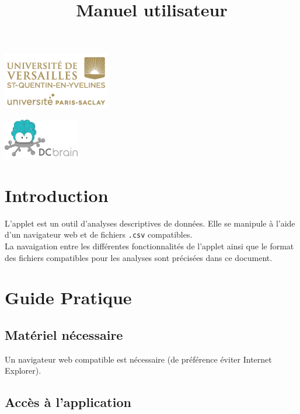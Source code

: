 

\title{\vspace{\fill}\textbf{\Huge Manuel utilisateur}}


\clearpage
\maketitle\vspace{9em}
\begin{center}\includegraphics[scale=0.7]{../Cahier/logo.png}\end{center}
\begin{center}\includegraphics[scale=3]{dcbrain.png}\end{center}
\newpage
\tableofcontents
\newpage\clearpage{}

\section{Introduction}
	L'applet est un outil d'analyses descriptives de données. Elle se manipule à l'aide d'un navigateur web et de fichiers \lstinline!.csv! compatibles.\\
	La navaigation entre les différentes fonctionnalités de l'applet ainsi que le format des fichiers compatibles pour les analyses sont précisées dans ce document.
	
\section{Guide Pratique}
	\subsection{Matériel nécessaire}
		Un navigateur web compatible est nécessaire (de préférence éviter Internet Explorer).
	\subsection{Accès à l'application}
